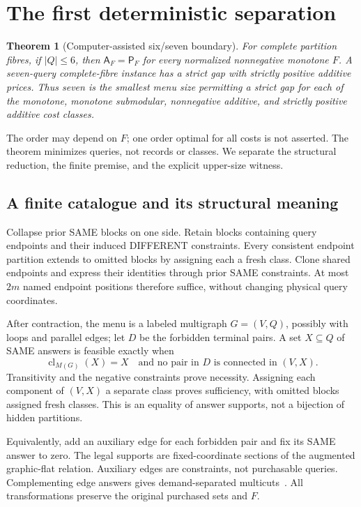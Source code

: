 \documentclass[pdflatex,sn-mathphys-num]{sn-jnl}
\newcommand{\A}{\mathsf{A}}
\newcommand{\Pcost}{\mathsf{P}}
\newcommand{\cl}{\operatorname{cl}}
\theoremstyle{thmstyleone}
\newtheorem{theorem}{Theorem}
\theoremstyle{thmstylethree}
\theoremstyle{thmstyletwo}
\begin{document}
\section{The first deterministic separation}\label{sec:det-thresholds}
\begin{theorem}[Computer-assisted six/seven boundary]\label{thm:boundary}
For complete partition fibres, if $|Q|\leq6$, then $\A_F=\Pcost_F$ for every normalized nonnegative monotone $F$. A seven-query complete-fibre instance has a strict gap with strictly positive additive prices. Thus seven is the smallest menu size permitting a strict gap for each of the monotone, monotone submodular, nonnegative additive, and strictly positive additive cost classes.
\end{theorem}
The order may depend on $F$; one order optimal for all costs is not asserted. The theorem minimizes queries, not records or classes. We separate the structural reduction, the finite premise, and the explicit upper-size witness.

\subsection{A finite catalogue and its structural meaning}\label{sec:catalogue}
Collapse prior SAME blocks on one side. Retain blocks containing query endpoints and their induced DIFFERENT constraints. Every consistent endpoint partition extends to omitted blocks by assigning each a fresh class. Clone shared endpoints and express their identities through prior SAME constraints. At most $2m$ named endpoint positions therefore suffice, without changing physical query coordinates.

After contraction, the menu is a labeled multigraph $G=(V,Q)$, possibly with loops and parallel edges; let $D$ be the forbidden terminal pairs. A set $X\subseteq Q$ of SAME answers is feasible exactly when
\begin{equation}\label{eq:flat}
 \cl_{M(G)}(X)=X
 \quad\text{and no pair in }D\text{ is connected in }(V,X).
\end{equation}
Transitivity and the negative constraints prove necessity. Assigning each component of $(V,X)$ a separate class proves sufficiency, with omitted blocks assigned fresh classes. This is an equality of answer supports, not a bijection of hidden partitions.

Equivalently, add an auxiliary edge for each forbidden pair and fix its SAME answer to zero. The legal supports are fixed-coordinate sections of the augmented graphic-flat relation. Auxiliary edges are constraints, not purchasable queries. Complementing edge answers gives demand-separated multicuts~\cite{berczi,hornakova}. All transformations preserve the original purchased sets and $F$.
\end{document}
